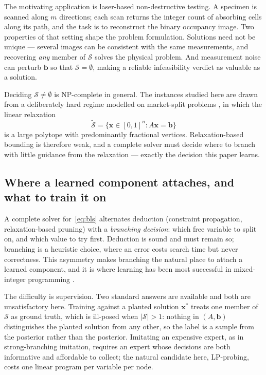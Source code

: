 \documentclass[final,5p,times,twocolumn]{elsarticle}
\newcommand{\SOL}{\mathcal{S}}
\begin{document}
The motivating application is laser-based non-destructive testing. A specimen is scanned along $m$ directions; each scan returns the integer count of absorbing cells along its path, and the task is to reconstruct the binary occupancy image. Two properties of that setting shape the problem formulation. Solutions need not be unique --- several images can be consistent with the same measurements, and recovering \emph{any} member of $\SOL$ solves the physical problem. And measurement noise can perturb $\mathbf{b}$ so that $\SOL=\emptyset$, making a reliable infeasibility verdict as valuable as a solution.

Deciding $\SOL\ne\emptyset$ is NP-complete in general. The instances studied here are drawn from a deliberately hard regime modelled on market-split problems \citep{cornuejols1999market, aardal2000market}, in which the linear relaxation
\begin{equation}
\tilde{\SOL} = \{\mathbf{x}\in[0,1]^n : A\mathbf{x}=\mathbf{b}\}
\end{equation}
is a large polytope with predominantly fractional vertices. Relaxation-based bounding is therefore weak, and a complete solver must decide where to branch with little guidance from the relaxation --- exactly the decision this paper learns.

\subsection{Where a learned component attaches, and what to train it on}

A complete solver for~\eqref{eq:bls} alternates deduction (constraint propagation, relaxation-based pruning) with a \emph{branching decision}: which free variable to split on, and which value to try first. Deduction is sound and must remain so; branching is a heuristic choice, where an error costs search time but never correctness. This asymmetry makes branching the natural place to attach a learned component, and it is where learning has been most successful in mixed-integer programming \citep{khalil2016learning, gasse2019exact}.

The difficulty is supervision. Two standard answers are available and both are unsatisfactory here. Training against a planted solution $\mathbf{x}^\ast$ treats one member of $\SOL$ as ground truth, which is ill-posed when $|\SOL|>1$: nothing in $(A,\mathbf{b})$ distinguishes the planted solution from any other, so the label is a sample from the posterior rather than the posterior. Imitating an expensive expert, as in strong-branching imitation, requires an expert whose decisions are both informative and affordable to collect; the natural candidate here, LP-probing, costs one linear program per variable per node.
\end{document}
